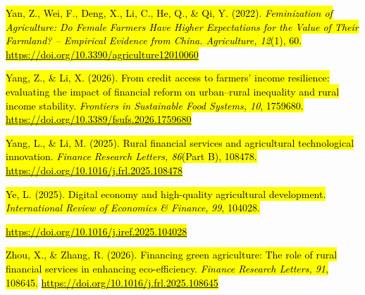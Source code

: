 \hl{Yan, Z., Wei, F., Deng, X., Li, C., He, Q., \& Qi, Y. (2022).
\emph{Feminization of Agriculture: Do Female Farmers Have Higher
Expectations for the Value of Their Farmland? -- Empirical Evidence from
China. Agriculture, 12}(1), 60.}
\href{https://doi.org/10.3390/agriculture12010060}{\hl{https://doi.org/10.3390/agriculture12010060}}

\hl{Yang, Z., \& Li, X. (2026). From credit access to farmers' income
resilience: evaluating the impact of financial reform on urban--rural
inequality and rural income stability. \emph{Frontiers in Sustainable
Food Systems, 10}, 1759680.}
\href{https://doi.org/10.3389/fsufs.2026.1759680}{\hl{https://doi.org/10.3389/fsufs.2026.1759680}}

\hl{Yang, L., \& Li, M. (2025). Rural financial services and
agricultural technological innovation. \emph{Finance Research Letters,
86}(Part B), 108478.}
\href{https://doi.org/10.1016/j.frl.2025.108478}{\hl{https://doi.org/10.1016/j.frl.2025.108478}}

\hl{Ye, L. (2025). Digital economy and high-quality agricultural
development. \emph{International Review of Economics \& Finance},
\emph{99}, 104028.}

\href{https://doi.org/10.1016/j.iref.2025.104028}{\hl{https://doi.org/10.1016/j.iref.2025.104028}}

\hl{Zhou, X., \& Zhang, R. (2026). Financing green agriculture: The role
of rural financial services in enhancing eco-efficiency. \emph{Finance
Research Letters, 91}, 108645.}
\href{https://doi.org/10.1016/j.frl.2025.108645}{\hl{https://doi.org/10.1016/j.frl.2025.108645}}
